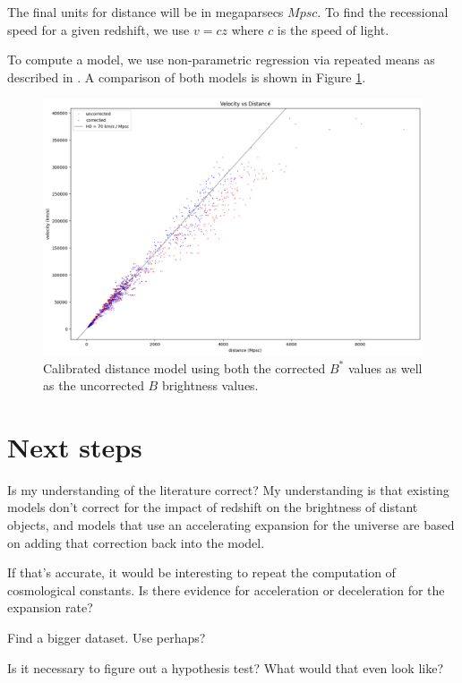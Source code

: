 \documentclass{article}
\begin{document}
The final units for distance will be in megaparsecs $Mpsc$. To find the
recessional speed for a given redshift, we use $v = cz$ where $c$ is the speed
of light.

To compute a model, we use non-parametric regression via repeated means as described in
\citet{siegel1982}. A comparison of both models is shown in Figure \ref{fig:calibrated}.

\begin{figure}[h!]
  \includegraphics[width=\linewidth]{../graphs/both_calibrated_velocity_vs_distance.png}
  \caption{Calibrated distance model using both the corrected $B^*$ values as
  well as the uncorrected $B$ brightness values.}
  \label{fig:calibrated}
\end{figure}


\section{Next steps}
\label{sec:nextsteps}

Is my understanding of the literature correct? My understanding is that
existing models don't correct for the impact of redshift on the brightness of
distant objects, and models that use an accelerating expansion for the universe
are based on adding that correction back into the model.

If that's accurate, it would be interesting to repeat the computation of
cosmological constants. Is there evidence for acceleration or deceleration
for the expansion rate?

Find a bigger dataset. Use \citet{abbott2024} perhaps?

Is it necessary to figure out a hypothesis test? What would that even look
like?



\end{document}
